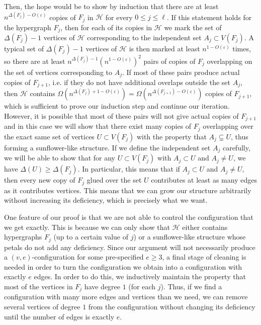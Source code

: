 \documentclass{daj}
\def\eps{\varepsilon}
\def\cH{\mathcal{H}}
\theoremstyle{plain}
\theoremstyle{remark}
\begin{document}
Then, the hope would be to show by induction that there are at least $n^{\Delta(F_j)-O(\eps)}$ copies of $F_j$ in $\cH$ for every $0 \le j \le \ell$. If this statement holds for the hypergraph $F_j$, then for each of its copies in $\cH$ we mark the set of $\Delta(F_j)-1$ vertices of $\cH$ corresponding to the independent set $A_j\subset V(F_j)$. A typical set of $\Delta(F_j)-1$ vertices of $\cH$ is then marked at least $n^{1-O(\eps)}$ times, so there are at least $n^{\Delta(F_j)-1}(n^{1-O(\eps)})^2$ pairs of copies of $F_j$ overlapping on the set of vertices corresponding to $A_j$. If most of these pairs produce actual copies of $F_{j+1}$, i.e. if they do not have additional overlaps outside the set $A_j$, then $\cH$ contains $\Omega(n^{\Delta(F_j)+1-O(\eps)}) = \Omega(n^{\Delta(F_{j+1})-O(\eps)})$ copies of $F_{j+1}$, which is sufficient to prove our induction step and continue our iteration. However, it is possible that most of these pairs will not give actual copies of $F_{j+1}$ and in this case we will show that there exist many copies of $F_j$ overlapping over the exact same set of vertices $U\subset V(F_j)$ with the property that $A_j\subsetneq U$, thus forming a sunflower-like structure. If we define the independent set $A_j$ carefully, we will be able to show that for any $U\subset V(F_j)$ with $A_j\subset U$ and $A_j \neq U$, we have $\Delta(U)\geq \Delta(F_j)$. In particular, this means that if $A_j\subset U$ and $A_j \neq U$, then every new copy of $F_j$ glued over the set $U$ contributes at least as many edges as it contributes vertices. This means that we can grow our structure arbitrarily without increasing its deficiency, which is precisely what we want.

One feature of our proof is that we are not able to control the configuration that we get exactly. This is because we can only show that $\cH$ either contains hypergraphs $F_j$ (up to a certain value of $j$) or a sunflower-like structure whose petals do not add any deficiency. Since our argument will not necessarily produce a $(v, e)$-configuration for some pre-specified $e \geq 3$, a final stage of cleaning is needed in order to turn the configuration we obtain into a configuration with exactly $e$ edges. In order to do this, we inductively maintain the property that most of the vertices in $F_j$ have degree $1$ (for each $j$). Thus, if we find a configuration with many more edges and vertices than we need, we can remove several vertices of degree $1$ from the configuration without changing its deficiency until the number of edges is exactly $e$.
\end{document}
